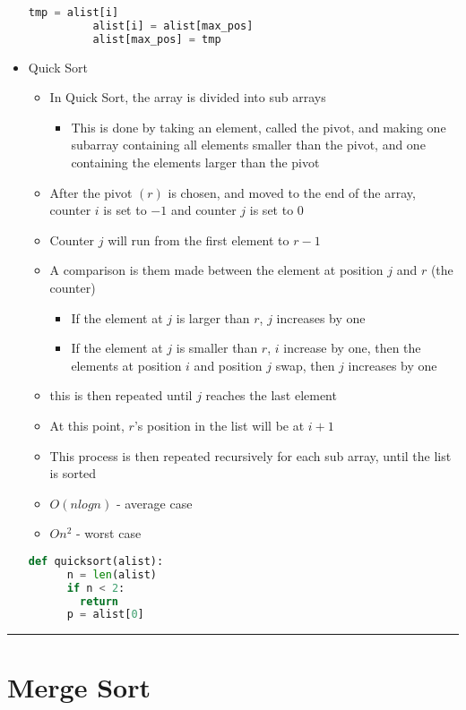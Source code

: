 \documentclass{article}
\begin{document}
\begin{itemize}
\begin{lstlisting}[language=Python, frame=single]
          tmp = alist[i]
          alist[i] = alist[max_pos]
          alist[max_pos] = tmp
  \end{lstlisting}
  \item{Quick Sort}
  \begin{itemize}
    \item{In Quick Sort, the array is divided into sub arrays}
    \begin{itemize}
      \item{This is done by taking an element, called the pivot, and making one subarray containing all elements smaller than the pivot, and one containing the elements larger than the pivot}
    \end{itemize}
    \item{After the pivot $(r)$ is chosen, and moved to the end of the array, counter $i$ is set to $-1$ and counter $j$ is set to $0$}
    \item{Counter $j$ will run from the first element to $r-1$}
    \item{A comparison is them made between the element at position $j$ and $r$ (the counter)}
    \begin{itemize}
      \item{If the element at $j$ is larger than $r$, $j$ increases by one}
      \item{If the element at $j$ is smaller than $r$, $i$ increase by one, then the elements at position $i$ and position $j$ swap, then $j$ increases by one}
    \end{itemize}
    \item{this is then repeated until $j$ reaches the last element}
    \item{At this point, $r$'s position in the list will be at $i+1$}
    \item{This process is then repeated recursively for each sub array, until the list is sorted}
    \item{$O(nlogn)$ - average case}
    \item{$O{n^2}$ - worst case}
  \end{itemize}
  \begin{lstlisting}[language=Python, frame=single]
  def quicksort(alist):
      n = len(alist)
      if n < 2:
        return
      p = alist[0]

  \end{lstlisting}
\end{itemize}

\begin{center}
  \rule{0.5\textwidth}{0.4pt}
\end{center}

\section{Merge Sort}
\begin{itemize}
\end{itemize}
\end{document}
